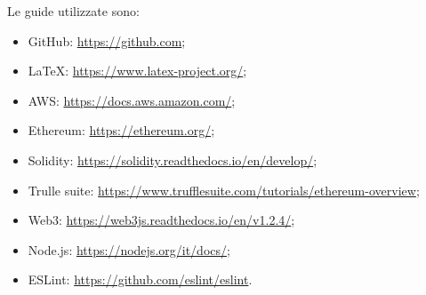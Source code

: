    			Le guide utilizzate sono:
   			\begin{itemize}
   				\item GitHub: \href{https://github.com}{https://github.com};
   				\item \LaTeX: \href{https://www.latex-project.org/}{https://www.latex-project.org/};
   				\item  AWS: \href{https://docs.aws.amazon.com/}{https://docs.aws.amazon.com/};
   				\item Ethereum\glos: \href{https://ethereum.org/}{https://ethereum.org/};
   				\item Solidity: \href{https://solidity.readthedocs.io/en/develop/}{https://solidity.readthedocs.io/en/develop/};
   				\item Trulle suite: \href{https://www.trufflesuite.com/tutorials/ethereum-overview}{https://www.trufflesuite.com/tutorials/ethereum-overview};
   				\item Web3: \href{https://web3js.readthedocs.io/en/v1.2.4/}{https://web3js.readthedocs.io/en/v1.2.4/};
   				\item Node.js: \href{https://nodejs.org/it/docs/}{https://nodejs.org/it/docs/};
   				\item ESLint: \href{https://github.com/eslint/eslint}{https://github.com/eslint/eslint}.
   			\end{itemize}
